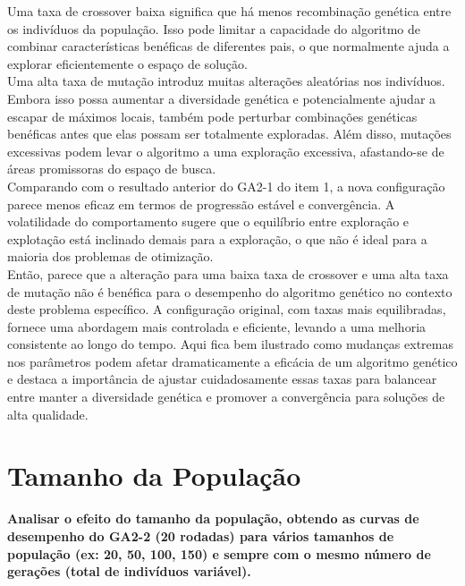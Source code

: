 \documentclass[a4paper, 12pt]{article}
\begin{document}
Uma taxa de crossover baixa significa que há menos recombinação genética entre os indivíduos da população. Isso pode limitar a capacidade do algoritmo de combinar características benéficas de diferentes pais, o que normalmente ajuda a explorar eficientemente o espaço de solução.\\

Uma alta taxa de mutação introduz muitas alterações aleatórias nos indivíduos. Embora isso possa aumentar a diversidade genética e potencialmente ajudar a escapar de máximos locais, também pode perturbar combinações genéticas benéficas antes que elas possam ser totalmente exploradas. Além disso, mutações excessivas podem levar o algoritmo a uma exploração excessiva, afastando-se de áreas promissoras do espaço de 
busca.\\

Comparando com o resultado anterior do GA2-1 do item 1, a nova configuração parece menos eficaz em termos de progressão estável e convergência. A volatilidade do comportamento sugere que o equilíbrio entre exploração e explotação está inclinado demais para a exploração, o que não é ideal para a maioria dos problemas de otimização.\\

Então, parece que a alteração para uma baixa taxa de crossover e uma alta taxa de mutação não é benéfica para o desempenho do algoritmo genético no contexto deste problema específico. A configuração original, com taxas mais equilibradas, fornece uma abordagem mais controlada e eficiente, levando a uma melhoria consistente ao longo do tempo. Aqui fica bem ilustrado como mudanças extremas nos parâmetros podem afetar dramaticamente a eficácia de um algoritmo genético e destaca a importância de ajustar cuidadosamente essas taxas para balancear entre manter a diversidade genética e promover a convergência para soluções de alta qualidade.



\newpage
\section{Tamanho da População}
\textbf{Analisar o efeito do tamanho da população, obtendo as curvas de desempenho do GA2-2 (20 rodadas) para vários 
tamanhos de população (ex: 20, 50, 100, 150) e sempre com o mesmo número de gerações (total de indivíduos 
variável).}\\
\end{document}
